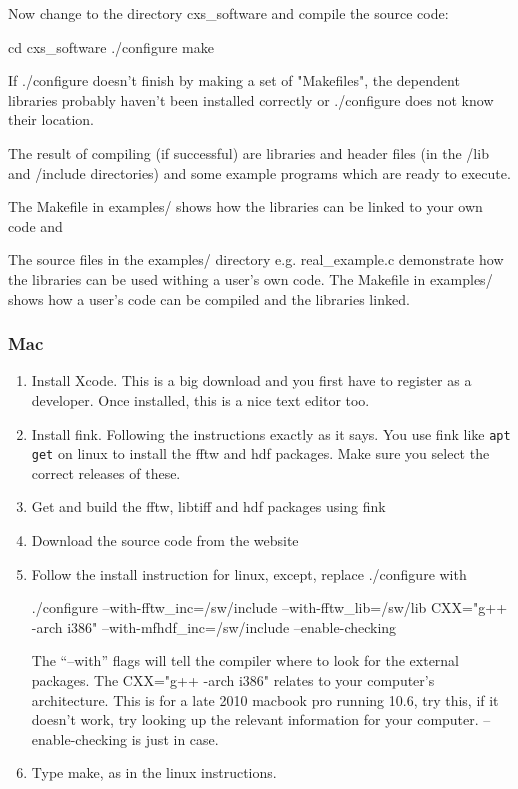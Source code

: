 \documentclass[]{cxs-software}
\begin{document}
Now change to the directory cxs\_software and compile the source code: 
\begin{myverbatim}
  cd cxs_software 
  ./configure 
  make
\end{myverbatim}

If ./configure doesn't finish by making a set of "Makefiles", the
dependent libraries probably haven't been installed correctly or
./configure does not know their location.

The result of compiling (if successful) are libraries and header files
(in the /lib and /include directories) and some example programs which
are ready to execute.

The Makefile in examples/ shows how the libraries can be linked to
your own code and 

The source files in the examples/ directory e.g. real\_example.c
demonstrate how the libraries can be used withing a user's own
code. The Makefile in examples/ shows how a user's code can be
compiled and the \name libraries linked.

\subsubsection{Mac}

\begin{enumerate}
\item Install Xcode\cite{}. This is a big download and you first have to register as a developer. Once installed, this is a nice text editor too.
\item Install fink\cite{}. Following the instructions exactly as it says. You
  use fink like {\tt apt get} on linux to install the fftw and hdf
  packages. Make sure you select the correct releases of these.
\item Get and build the fftw, libtiff and hdf packages using fink
\item Download the \name source code from the website
\item Follow the install instruction for linux, except, replace ./configure with 
\begin{myverbatim}
  ./configure --with-fftw_inc=/sw/include --with-fftw_lib=/sw/lib CXX="g++ -arch i386" --with-mfhdf_inc=/sw/include --enable-checking
\end{myverbatim}
The ``--with'' flags will tell the compiler where to look for the
external packages.  The CXX="g++ -arch i386" relates to your
computer's architecture. This is for a late 2010 macbook pro running
10.6, try this, if it doesn't work, try looking up the relevant
information for your computer. --enable-checking is just in case.
\item Type make, as in the linux instructions.
\end{enumerate}
\end{document}
